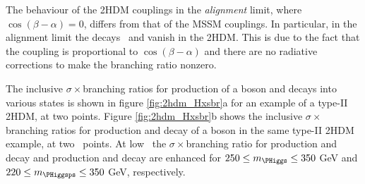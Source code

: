 The behaviour of the \ac{2HDM} couplings in the \textit{alignment} limit,
where $\cos{(\beta-\alpha)} = 0$, differs from that of the \ac{MSSM} couplings.
In particular, in the alignment limit the decays \AtoZh~and \Htohh vanish
in the \ac{2HDM}. This is due to the fact that the coupling is 
proportional to $\cos{(\beta-\alpha)}$ and there are no radiative corrections
to make the branching ratio nonzero.

The inclusive $\sigma\times$branching ratios for production of a \PHiggs boson 
and decays into various states is shown in figure \ref{fig:2hdm_Hxsbr}a for an 
example of a type-II \ac{2HDM}, at two \tanb points. Figure \ref{fig:2hdm_Hxsbr}b 
shows the inclusive $\sigma\times$branching ratios for production and decay
of a \PHiggsps boson in the same type-II \ac{2HDM} example, at two \tanb~points. At
low \tanb~the $\sigma\times$branching ratio for \Htohh production and decay and \AtoZh production
and decay are enhanced for $250\leq m_{\PHiggs}\leq 350$ GeV and $220 \leq m_{\PHiggsps} \leq 350$ GeV, respectively.

